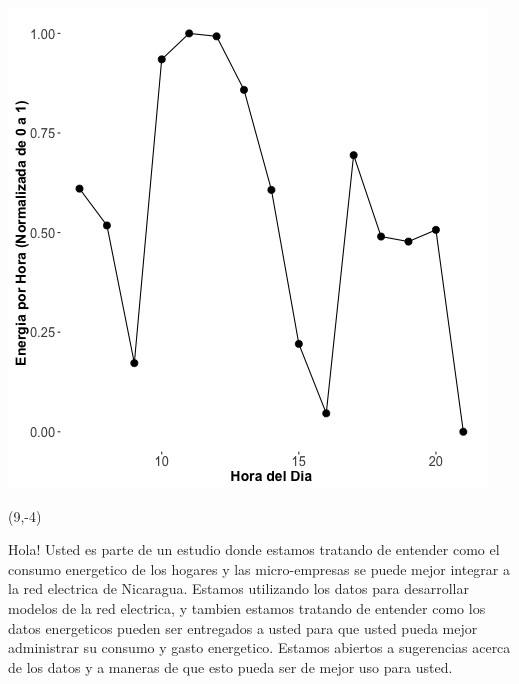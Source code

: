 \documentclass{article}\usepackage[]{graphicx}\usepackage[]{color}
\newenvironment{knitrout}{}{} %
\begin{document}
\begin{knitrout}
\color{fgcolor}
\includegraphics[scale=0.75]{figure/A26_fplot_norm_median} 
\end{knitrout}

 \begin{textblock}{1}(9,-4)
\begin{minipage}{20em}
\begingroup

\endgroup
\end{minipage}
\end{textblock}

\vspace{70px}
\begin{knitrout}
Hola! Usted es parte de un estudio donde estamos tratando de entender como el consumo energetico de los hogares y las micro-empresas se puede mejor integrar a la red electrica de Nicaragua. Estamos utilizando los datos para desarrollar modelos de la red electrica, y tambien estamos tratando de entender como los datos energeticos pueden ser entregados a usted para que usted pueda mejor administrar su consumo y gasto energetico.  Estamos abiertos a sugerencias acerca de los datos y a maneras de que esto pueda ser de mejor uso para usted.
\end{knitrout}
\end{document}
